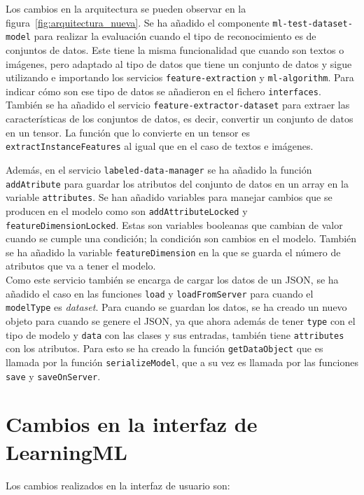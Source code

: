 \documentclass[a4paper, 12pt]{book}
\begin{document}
Los cambios en la arquitectura se pueden observar en la figura~\ref{fig:arquitectura_nueva}. 
Se ha añadido el componente \texttt{ml-test-dataset-model} para realizar la evaluación cuando el tipo de reconocimiento es de conjuntos de datos. Este tiene la misma funcionalidad que cuando son textos o imágenes, pero adaptado al tipo de datos que tiene un conjunto de datos y sigue utilizando e importando los servicios \texttt{feature-extraction} y \texttt{ml-algorithm}. Para indicar cómo son ese tipo de datos se añadieron en el fichero \texttt{interfaces}. \\
También se ha añadido el servicio \texttt{feature-extractor-dataset} para extraer las características de los conjuntos de datos, es decir, convertir un conjunto de datos en un tensor. 
La función que lo convierte en un tensor es \texttt{extractInstanceFeatures} al igual que en el caso de textos e imágenes.

Además, en el servicio \texttt{labeled-data-manager} se ha añadido la función \texttt{addAtribute} para guardar los atributos del conjunto de datos en un array en la variable \texttt{attributes}. 
Se han añadido variables para manejar cambios que se producen en el modelo como son \texttt{addAttributeLocked} y \texttt{featureDimensionLocked}. Estas son variables booleanas que cambian de valor cuando se cumple una condición; la condición son cambios en el modelo. 
También se ha añadido la variable \texttt{featureDimension} en la que se guarda el número de atributos que va a tener el modelo. \\
Como este servicio también se encarga de cargar los datos de un JSON, se ha añadido el caso en las funciones \texttt{load} y \texttt{loadFromServer} para cuando el \texttt{modelType} es \emph{dataset}. 
Para cuando se guardan los datos, se ha creado un nuevo objeto para cuando se genere el JSON, ya que ahora además de tener \texttt{type} con el tipo de modelo y \texttt{data} con las clases y sus entradas, también tiene \texttt{attributes} con los atributos. 
Para esto se ha creado la función \texttt{getDataObject} que es llamada por la función \texttt{serializeModel}, que a su vez es llamada por las funciones \texttt{save} y \texttt{saveOnServer}.


\section{Cambios en la interfaz de LearningML} 
\label{sec:interfaz}

Los cambios realizados en la interfaz de usuario son:
\end{document}
